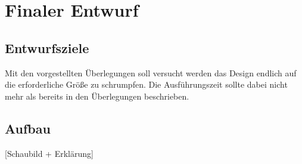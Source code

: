 \section{Finaler Entwurf}
\subsection{Entwurfsziele}
Mit den vorgestellten Überlegungen soll versucht werden das Design endlich auf die erforderliche Größe zu schrumpfen.
Die Ausführungszeit sollte dabei nicht mehr als bereits in den Überlegungen beschrieben.

\subsection{Aufbau}
[Schaubild + Erklärung]

